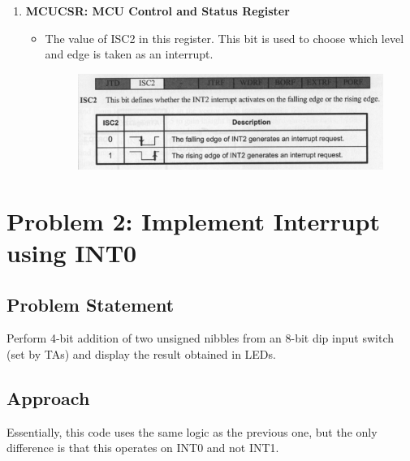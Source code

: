 \documentclass[titlepage, 11pt]{article}
\begin{document}
\begin{enumerate}
    \item \textbf{MCUCSR: MCU Control and Status Register}
        \begin{itemize}
            \item The value of ISC2 in this register. This bit is used to choose which level and edge is taken as an interrupt.
            \begin{figure}[H]
                \centering
                \includegraphics[width=1\linewidth]{MCUCSR.png}
            \end{figure}
        \end{itemize}        
\end{enumerate}

\section{Problem 2: Implement Interrupt using INT0} 

\subsection{Problem Statement}
Perform 4-bit addition of two unsigned nibbles from an 8-bit dip input switch (set by TAs) and display the result obtained in LEDs.

\subsection{Approach}
Essentially, this code uses the same logic as the previous one, but the only difference is that this operates on INT0 and not INT1.
\end{document}
